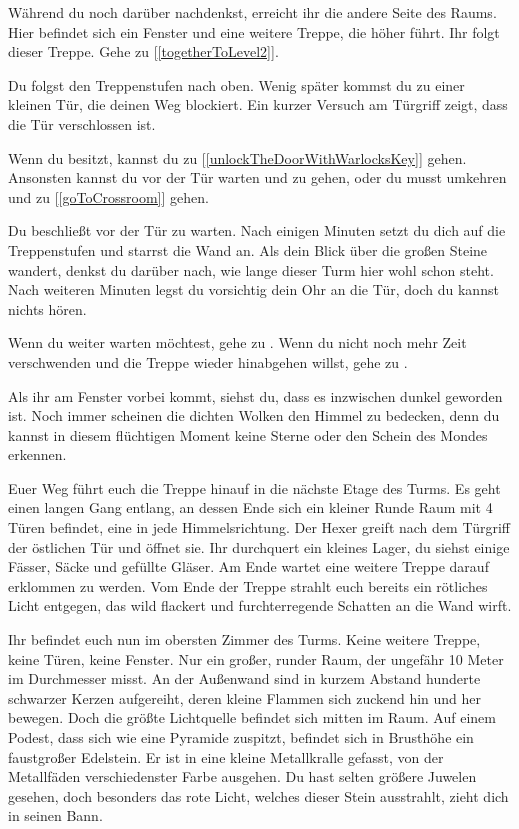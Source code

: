 Während du noch darüber nachdenkst, erreicht ihr die andere Seite des Raums. Hier befindet sich ein Fenster und eine weitere Treppe, die höher führt. Ihr folgt dieser Treppe.
Gehe zu [\ref{togetherToLevel2}].


Du folgst den Treppenstufen nach oben. Wenig später kommst du zu einer kleinen Tür, die deinen Weg blockiert. Ein kurzer Versuch am Türgriff zeigt, dass die Tür verschlossen ist.

Wenn du  besitzt, kannst du zu [\ref{unlockTheDoorWithWarlocksKey}] gehen.
Ansonsten kannst du vor der Tür warten und zu  gehen, oder du musst umkehren und zu [\ref{goToCrossroom}] gehen.


Du beschließt vor der Tür zu warten. Nach einigen Minuten setzt du dich auf die Treppenstufen und starrst die Wand an. Als dein Blick über die großen Steine wandert, denkst du darüber nach, wie lange dieser Turm hier wohl schon steht. Nach weiteren Minuten legst du vorsichtig dein Ohr an die Tür, doch du kannst nichts hören.

Wenn du weiter warten möchtest, gehe zu .
Wenn du nicht noch mehr Zeit verschwenden und die Treppe wieder hinabgehen willst, gehe zu .


Als ihr am Fenster vorbei kommt, siehst du, dass es inzwischen dunkel geworden ist. Noch immer scheinen die dichten Wolken den Himmel zu bedecken, denn du kannst in diesem flüchtigen Moment keine Sterne oder den Schein des Mondes erkennen.

Euer Weg führt euch die Treppe hinauf in die nächste Etage des Turms. Es geht einen langen Gang entlang, an dessen Ende sich ein kleiner Runde Raum mit 4 Türen befindet, eine in jede Himmelsrichtung. Der Hexer greift nach dem Türgriff der östlichen Tür und öffnet sie. Ihr durchquert ein kleines Lager, du siehst einige Fässer, Säcke und gefüllte Gläser. Am Ende wartet eine weitere Treppe darauf erklommen zu werden. Vom Ende der Treppe strahlt euch bereits ein rötliches Licht entgegen, das wild flackert und furchterregende Schatten an die Wand wirft.

Ihr befindet euch nun im obersten Zimmer des Turms. Keine weitere Treppe, keine Türen, keine Fenster. Nur ein großer, runder Raum, der ungefähr 10 Meter im Durchmesser misst. An der Außenwand sind in kurzem Abstand hunderte schwarzer Kerzen aufgereiht, deren kleine Flammen sich zuckend hin und her bewegen.
Doch die größte Lichtquelle befindet sich mitten im Raum. Auf einem Podest, dass sich wie eine Pyramide zuspitzt, befindet sich in Brusthöhe ein faustgroßer Edelstein. Er ist in eine kleine Metallkralle gefasst, von der Metallfäden verschiedenster Farbe ausgehen. Du hast selten größere Juwelen gesehen, doch besonders das rote Licht, welches dieser Stein ausstrahlt, zieht dich in seinen Bann.

